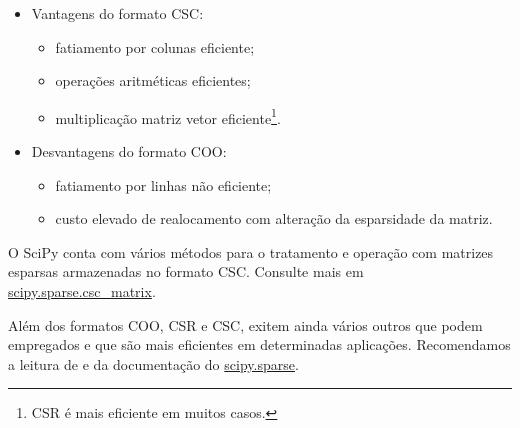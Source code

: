 \begin{itemize}
\item Vantagens do formato CSC:
  \begin{itemize}
  \item fatiamento por colunas eficiente;
  \item operações aritméticas eficientes;
  \item multiplicação matriz vetor eficiente\footnote{CSR é mais eficiente em muitos casos.}.
  \end{itemize}
\item Desvantagens do formato COO:
  \begin{itemize}
  \item fatiamento por linhas não eficiente;
  \item custo elevado de realocamento com alteração da esparsidade da matriz.
  \end{itemize}
\end{itemize}

\begin{obs}
  O SciPy conta com vários métodos para o tratamento e operação com matrizes esparsas armazenadas no formato CSC. Consulte mais em \href{https://docs.scipy.org/doc/scipy/reference/generated/scipy.sparse.csc_matrix.html}{scipy.sparse.csc\_matrix}.
\end{obs}

\begin{obs}
  Além dos formatos COO, CSR e CSC, exitem ainda vários outros que podem empregados e que são mais eficientes em determinadas aplicações. Recomendamos a leitura de \cite[Seção 3.4]{Saad2003} e da documentação do \href{https://docs.scipy.org/doc/scipy/reference/sparse.html}{scipy.sparse}.
\end{obs}


